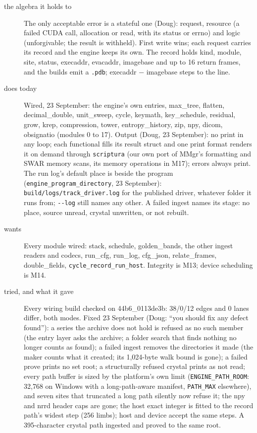 \begin{description}
\item[{the algebra it holds to}] The only acceptable error is a stateful one (Doug): request, resource (a failed CUDA call, allocation or read, with its status or errno) and logic (unforgivable; the result is withheld). First write wins; each request carries its record and the engine keeps its own. The record holds kind, module, site, status, execaddr, evacaddr, imagebase and up to 16 return frames, and the builds emit a \texttt{.\allowbreak{}pdb}; execaddr − imagebase steps to the line.
\item[{does today}] Wired, 23 September: the engine's own entries, max\_\allowbreak{}tree, flatten, decimal\_\allowbreak{}double, unit\_\allowbreak{}sweep, cycle, keymath, key\_\allowbreak{}schedule, residual, grow, krep, compression, tower, entropy\_\allowbreak{}history, zip, npy, dicom, obsignatio (modules 0 to 17). Output (Doug, 23 September): no print in any loop; each functional fills its result struct and one print format renders it on demand through \texttt{scriptura} (our own port of MMgr's formatting and SWAR memory scans, its memory operations in M17); errors always print. The run log's default place is beside the program (\texttt{engine\_\allowbreak{}program\_\allowbreak{}directory}, 23 September): \texttt{build/\allowbreak{}logs/\allowbreak{}track\_\allowbreak{}driver.\allowbreak{}log} for the published driver, whatever folder it runs from; \texttt{-\allowbreak{}-\allowbreak{}log} still names any other. A failed ingest names its stage: no place, source unread, crystal unwritten, or not rebuilt.
\item[{wants}] Every module wired: stack, schedule, golden\_\allowbreak{}bands, the other ingest readers and codecs, run\_\allowbreak{}cfg, run\_\allowbreak{}log, cfg\_\allowbreak{}json, relate\_\allowbreak{}frames, double\_\allowbreak{}fields, \texttt{cycle\_\allowbreak{}record\_\allowbreak{}run\_\allowbreak{}host}. Integrity is M13; device scheduling is M14.
\item[{tried, and what it gave}] Every wiring build checked on 44b6\_\allowbreak{}0113de3b: 38/0/12 edges and 0 lanes differ, both modes. Fixed 23 September (Doug: “you should fix any defect found”): a series the archive does not hold is refused as no such member (the entry layer asks the archive; a folder search that finds nothing no longer counts as found); a failed ingest removes the directories it made (the maker counts what it created; its 1,024-byte walk bound is gone); a failed prove prints no set root; a structurally refused crystal prints as not read; every path buffer is sized by the platform's own limit (\texttt{ENGINE\_\allowbreak{}PATH\_\allowbreak{}ROOM}: 32,768 on Windows with a long-path-aware manifest, \texttt{PATH\_\allowbreak{}MAX} elsewhere), and seven sites that truncated a long path silently now refuse it; the npy and nrrd header caps are gone; the host exact integer is fitted to the record path's widest step (256 limbs); host and device accept the same steps. A 395-character crystal path ingested and proved to the same root.

\end{description}
